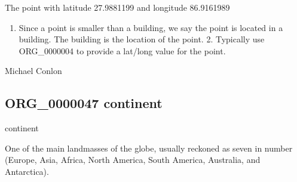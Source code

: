 \documentclass[letterpaper,10pt,english]{sphinxmanual}
\begin{document}
\begin{sphinxShadowBox}

\sphinxAtStartPar
The point with latitude 27.9881199 and longitude 86.9161989
\end{sphinxShadowBox}

\begin{sphinxShadowBox}
\begin{enumerate}
%
\item {} 
\sphinxAtStartPar
Since a point is smaller than a building, we say the point is located in a building.  The building is the location of the point.  2. Typically use ORG\_0000004 to provide a lat/long value for the point.

\end{enumerate}
\end{sphinxShadowBox}

\begin{sphinxShadowBox}

\sphinxAtStartPar
Michael Conlon 
\end{sphinxShadowBox}
\begin{quote}

\ignorespaces \end{quote}


\subsection{ORG\_0000047 \sphinxhyphen{} continent}
\label{\detokenize{doc-ORG_0000047:org-0000047-continent}}\label{\detokenize{doc-ORG_0000047:index-0}}\label{\detokenize{doc-ORG_0000047::doc}}
\begin{sphinxShadowBox}

\sphinxAtStartPar
continent
\end{sphinxShadowBox}

\begin{sphinxShadowBox}

\sphinxAtStartPar
One of the main landmasses of the globe, usually reckoned as seven in number (Europe, Asia, Africa, North America, South America, Australia, and Antarctica).
\end{sphinxShadowBox}
\end{document}
